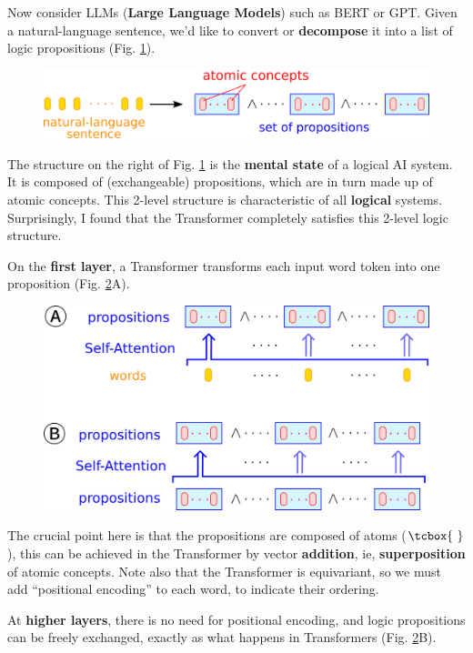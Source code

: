 \documentclass[runningheads]{llncs}
\newcommand{\circled}[1]{{\textcircled{\sffamily \scriptsize{#1}}}}
\newcommand{\atom}{\vcenter{\hbox{\tcbox{\mbox{     }}}}}
\begin{document}
Now consider LLMs (\textbf{Large Language Models}) such as BERT or GPT.  Given a natural-language sentence, we'd like to convert or \textbf{decompose} it into a list of logic propositions (Fig. \ref{Transformer-layer1}).
\begin{figure}[h]
	\centering
	\includegraphics[scale=0.6]{Transformer-layer1.png}
	\caption{}
	\label{Transformer-layer1}
\end{figure}
The structure on the right of Fig. \ref{Transformer-layer1} is the \textbf{mental state} of a logical AI system.  It is composed of (exchangeable) propositions, which are in turn made up of atomic concepts.  This 2-level structure is characteristic of all \textbf{logical} systems.  Surprisingly, I found that the Transformer completely satisfies this 2-level logic structure.

On the \textbf{first layer}, a Transformer transforms each input word token into one proposition (Fig. \ref{Transformer-layers}\circled{A}).
\begin{figure}
	\centering
	\includegraphics[scale=0.6]{Transformer-layers.png}
	\caption{}
	\label{Transformer-layers}
\end{figure}
The crucial point here is that the propositions are composed of atoms ($\atom$), this can be achieved in the Transformer by vector \textbf{addition}, ie, \textbf{superposition} of atomic concepts.  Note also that the Transformer is equivariant, so we must add ``positional encoding'' to each word, to indicate their ordering.

At \textbf{higher layers}, there is no need for positional encoding, and logic propositions can be freely exchanged, exactly as what happens in Transformers (Fig. \ref{Transformer-layers}\circled{B}).
\end{document}
